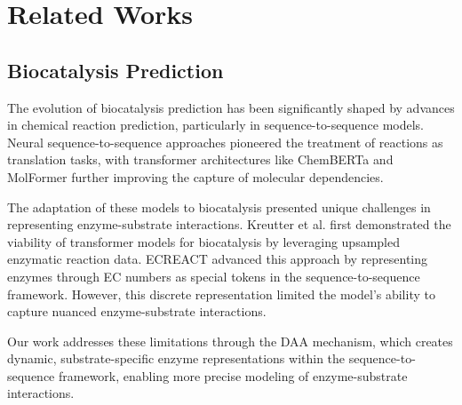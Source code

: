 \section{Related Works}
\subsection{Biocatalysis Prediction}
The evolution of biocatalysis prediction has been significantly shaped by advances in chemical reaction prediction, particularly in sequence-to-sequence models. Neural sequence-to-sequence approaches \cite{schwaller2019molecular} pioneered the treatment of reactions as translation tasks, with transformer architectures like ChemBERTa \cite{ChithranandaChemBERTa} and MolFormer \cite{ross2022large} further improving the capture of molecular dependencies.

The adaptation of these models to biocatalysis presented unique challenges in representing enzyme-substrate interactions. Kreutter et al. \cite{kreutter2021predicting} first demonstrated the viability of transformer models for biocatalysis by leveraging upsampled enzymatic reaction data. ECREACT \cite{Probst2022} advanced this approach by representing enzymes through EC numbers as special tokens in the sequence-to-sequence framework. However, this discrete representation limited the model's ability to capture nuanced enzyme-substrate interactions.

Our work addresses these limitations through the DAA mechanism, which creates dynamic, substrate-specific enzyme representations within the sequence-to-sequence framework, enabling more precise modeling of enzyme-substrate interactions.


